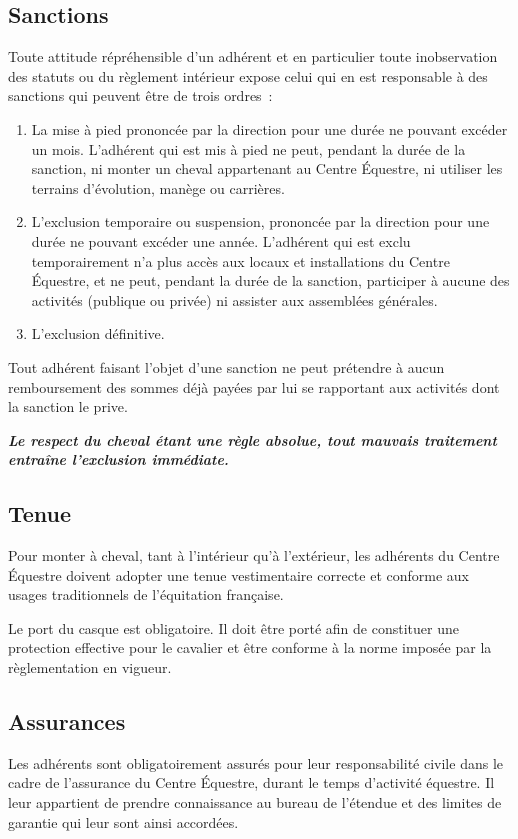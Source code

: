 \documentclass[11pt,a4paper]{article}
\begin{document}
\subsection{Sanctions}\label{subsec:sanctions}
Toute attitude répréhensible d'un adhérent et en particulier toute inobservation des statuts ou du règlement intérieur expose celui qui en est responsable à des sanctions qui peuvent être de trois ordres~:
\begin{enumerate}
\item
La mise à pied prononcée par la direction pour une durée ne pouvant excéder un mois.
L'adhérent qui est mis à pied ne peut, pendant la durée de la sanction, ni monter un cheval appartenant au Centre Équestre, ni utiliser les terrains d'évolution, manège ou carrières.
\item
L'exclusion temporaire ou suspension, prononcée par la direction pour une durée ne pouvant excéder une année.
L'adhérent qui est exclu temporairement n'a plus accès aux locaux et installations du Centre Équestre, et ne peut, pendant la durée de la sanction, participer à aucune des activités (publique ou privée) ni assister aux assemblées générales.
\item
L'exclusion définitive.
\end{enumerate}
Tout adhérent faisant l'objet d'une sanction ne peut prétendre à aucun remboursement des sommes déjà payées par lui se rapportant aux activités dont la sanction le prive.

\textit{\textbf{Le respect du cheval étant une règle absolue, tout mauvais traitement entraîne l'exclusion immédiate.}}

\subsection{Tenue}\label{subsec:tenue}
Pour monter à cheval, tant à l'intérieur qu'à l'extérieur, les adhérents du Centre Équestre doivent adopter une tenue vestimentaire correcte et conforme aux usages traditionnels de l'équitation française.

Le port du casque est obligatoire.
Il doit être porté afin de constituer une protection effective pour le cavalier et être conforme à la norme imposée par la règlementation en vigueur.

\subsection{Assurances}\label{subsec:assurances}
Les adhérents sont obligatoirement assurés pour leur responsabilité civile dans le cadre de l'assurance du Centre Équestre, durant le temps d'activité équestre.
Il leur appartient de prendre connaissance au bureau de l'étendue et des limites de garantie qui leur sont ainsi accordées.
\end{document}
